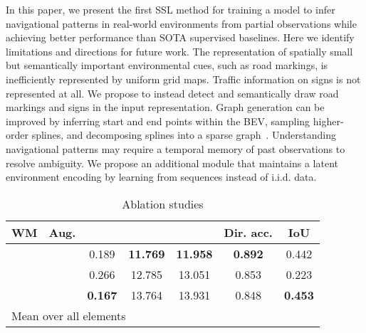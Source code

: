 \documentclass[letterpaper, 10 pt, conference]{ieeeconf}
\newcommand{\cmark}{\ding{51}}\newcommand{\xmark}{\ding{55}}\usepackage[hidelinks]{hyperref}
\begin{document}
In this paper, we present the first SSL method for training a model to infer navigational patterns in real-world environments from partial observations while achieving better performance than SOTA supervised baselines.
Here we identify limitations and directions for future work.
The representation of spatially small but semantically important environmental cues, such as road markings, is inefficiently represented by uniform grid maps. Traffic information on signs is not represented at all. We propose to instead detect and semantically draw road markings and signs in the input representation.
Graph generation can be improved by inferring start and end points within the BEV, sampling higher-order splines, and decomposing splines into a sparse graph~\cite{karlsson2021gdsla}.
Understanding navigational patterns may require a temporal memory of past observations to resolve ambiguity. We propose an additional module that maintains a latent environment encoding by learning from sequences instead of i.i.d. data.




\begin{table}[t]\caption{Ablation studies}
\vspace{-4mm}
\begin{center}
\begin{tabular}{|c|c|c|c|c|c|c|}
    \hline
     WM & Aug. &  &  &  & Dir. acc. & IoU \\ \hline
    \cmark & \cmark & 0.189 & \textbf{11.769} & \textbf{11.958} & \textbf{0.892} & 0.442 \\ \hline
    \xmark & \cmark & 0.266 & 12.785 & 13.051 & 0.853 & 0.223 \\ \hline
    \cmark & \xmark & \textbf{0.167} & 13.764 & 13.931 & 0.848 & \textbf{0.453} \\ \hline
   \multicolumn{6}{l}{Mean over all elements}
\end{tabular}
\label{tab:ablation_study}
\end{center}
\vspace{-3mm}
\end{table}
\end{document}

